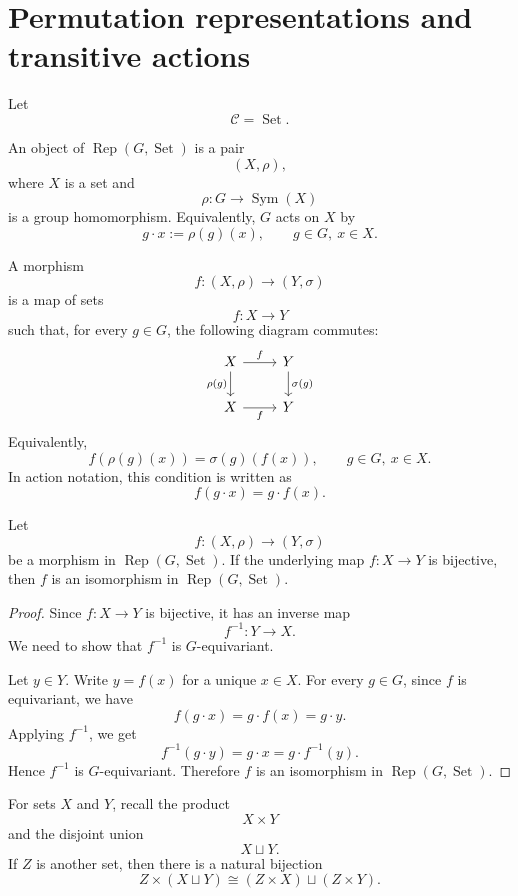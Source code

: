 \section{Permutation representations and transitive actions}

Let
\[
    \mathcal{C}=\operatorname{Set}.
\]

An object of \(\operatorname{Rep}(G,\operatorname{Set})\) is a pair
\[
    (X,\rho),
\]
where \(X\) is a set and
\[
    \rho:G\longrightarrow \operatorname{Sym}(X)
\]
is a group homomorphism. Equivalently, \(G\) acts on \(X\) by
\[
    g\cdot x:=\rho(g)(x),
    \qquad g\in G,\ x\in X.
\]

A morphism
\[
    f:(X,\rho)\longrightarrow (Y,\sigma)
\]
is a map of sets
\[
    f:X\longrightarrow Y
\]
such that, for every \(g\in G\), the following diagram commutes:
\[
\begin{tikzcd}
    X \arrow[r,"f"] \arrow[d,"\rho(g)"']
        & Y \arrow[d,"\sigma(g)"] \\
    X \arrow[r,"f"']
        & Y
\end{tikzcd}
\]
Equivalently,
\[
    f(\rho(g)(x))=\sigma(g)(f(x)),
    \qquad g\in G,\ x\in X.
\]
In action notation, this condition is written as
\[
    f(g\cdot x)=g\cdot f(x).
\]

\begin{lemma}
    Let
    \[
        f:(X,\rho)\longrightarrow (Y,\sigma)
    \]
    be a morphism in \(\operatorname{Rep}(G,\operatorname{Set})\). If the
    underlying map \(f:X\to Y\) is bijective, then \(f\) is an isomorphism in
    \(\operatorname{Rep}(G,\operatorname{Set})\).
\end{lemma}

\begin{proof}
    Since \(f:X\to Y\) is bijective, it has an inverse map
    \[
        f^{-1}:Y\longrightarrow X.
    \]
    We need to show that \(f^{-1}\) is \(G\)-equivariant.

    Let \(y\in Y\). Write \(y=f(x)\) for a unique \(x\in X\). For every \(g\in G\),
    since \(f\) is equivariant, we have
    \[
        f(g\cdot x)=g\cdot f(x)=g\cdot y.
    \]
    Applying \(f^{-1}\), we get
    \[
        f^{-1}(g\cdot y)=g\cdot x=g\cdot f^{-1}(y).
    \]
    Hence \(f^{-1}\) is \(G\)-equivariant. Therefore \(f\) is an isomorphism in
    \(\operatorname{Rep}(G,\operatorname{Set})\).
\end{proof}

For sets \(X\) and \(Y\), recall the product
\[
    X\times Y
\]
and the disjoint union
\[
    X\sqcup Y.
\]
If \(Z\) is another set, then there is a natural bijection
\[
    Z\times (X\sqcup Y)
    \cong
    (Z\times X)\sqcup (Z\times Y).
\]

